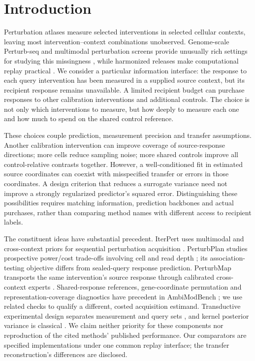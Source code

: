 \section{Introduction}
Perturbation atlases measure selected interventions in selected cellular contexts, leaving most intervention--context combinations unobserved. Genome-scale Perturb-seq and multimodal perturbation screens provide unusually rich settings for studying this missingness \citep{replogle2022,frangieh2021}, while harmonized releases make computational replay practical \citep{scperturb2024}. We consider a particular information interface: the response to each query intervention has been measured in a supplied source context, but its recipient response remains unavailable. A limited recipient budget can purchase responses to other calibration interventions and additional controls. The choice is not only which interventions to measure, but how deeply to measure each one and how much to spend on the shared control reference.

These choices couple prediction, measurement precision and transfer assumptions. Another calibration intervention can improve coverage of source-response directions; more cells reduce sampling noise; more shared controls improve all control-relative contrasts together. However, a well-conditioned fit in estimated source coordinates can coexist with misspecified transfer or errors in those coordinates. A design criterion that reduces a surrogate variance need not improve a strongly regularized predictor's squared error. Distinguishing these possibilities requires matching information, prediction backbones and actual purchases, rather than comparing method names with different access to recipient labels.

The constituent ideas have substantial precedent. IterPert uses multimodal and cross-context priors for sequential perturbation acquisition \citep{iterpert2024}. PerturbPlan studies prospective power/cost trade-offs involving cell and read depth \citep{perturbplan2026}; its association-testing objective differs from sealed-query response prediction. PerturbMap transports the same intervention's source response through calibrated cross-context experts \citep{perturbmap2026}. Shared-response references, gene-coordinate permutation and representation-coverage diagnostics have precedent in AmbiModBench \citep{ambimodbench2026}; we use related checks to qualify a different, costed acquisition estimand. Transductive experimental design separates measurement and query sets \citep{fiez2019}, and kernel posterior variance is classical \citep{gpml2006}. We claim neither priority for these components nor reproduction of the cited methods' published performance. Our comparators are specified implementations under one common replay interface; the transfer reconstruction's differences are disclosed.

